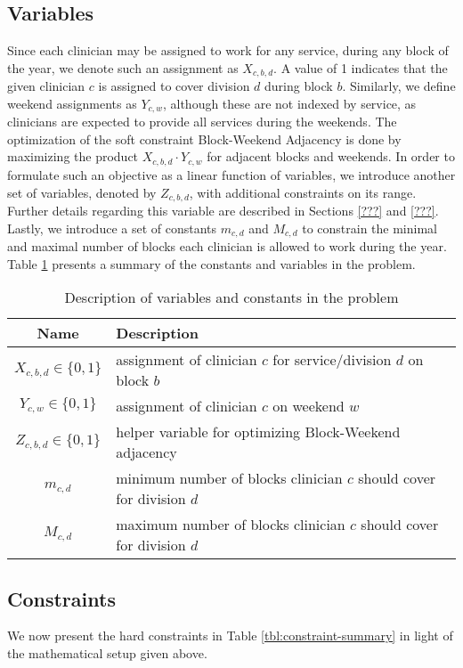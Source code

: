 \subsection{Variables}
Since each clinician may be assigned to work for any service, during any block of the year, we denote such an assignment as $X_{c, b, d}$. A value of 1 indicates that the given clinician $c$ is assigned to cover division $d$ during block $b$. Similarly, we define weekend assignments as $Y_{c, w}$, although these are not indexed by service, as clinicians are expected to provide all services during the weekends. The optimization of the soft constraint Block-Weekend Adjacency is done by maximizing the product $X_{c, b, d} \cdot Y_{c, w}$ for adjacent blocks and weekends. In order to formulate such an objective as a linear function of variables, we introduce another set of variables, denoted by $Z_{c, b, d}$, with additional constraints on its range. Further details regarding this variable are described in Sections \ref{???} and \ref{???}. Lastly, we introduce a set of constants $m_{c, d}$ and $M_{c, d}$ to constrain the minimal and maximal number of blocks each clinician is allowed to work during the year. Table \ref{tbl:variables-constants} presents a summary of the constants and variables in the problem.

\begin{table}[h]
	\centering
	\begin{tabular}{ c l }
		\hline
		\textbf{Name}              & \textbf{Description}                                                 \\ \hline
		$X_{c, b, d} \in \{0, 1\}$ & assignment of clinician $c$ for service/division $d$ on block $b$    \\
		$Y_{c, w} \in \{0, 1\}$    & assignment of clinician $c$ on weekend $w$                           \\
		$Z_{c, b, d} \in \{0, 1\}$ & helper variable for optimizing Block-Weekend adjacency               \\
		$m_{c, d}$                 & minimum number of blocks clinician $c$ should cover for division $d$ \\
		$M_{c, d}$                 & maximum number of blocks clinician $c$ should cover for division $d$
	\end{tabular}
	\caption{Description of variables and constants in the problem}
	\label{tbl:variables-constants}
\end{table}

\subsection{Constraints}
We now present the hard constraints in Table \ref{tbl:constraint-summary} in light of the mathematical setup given above.

